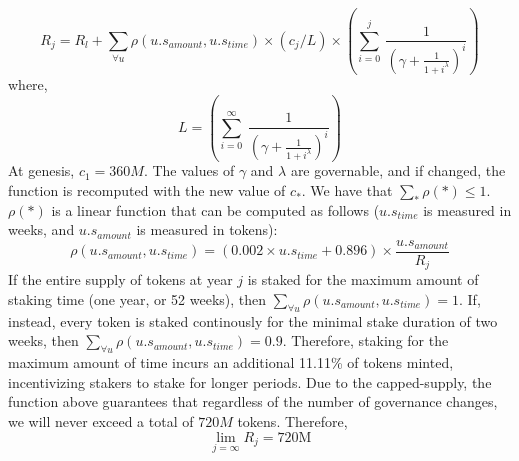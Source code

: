 \documentclass[runningheads]{llncs}
\newcommand\ddfrac[2]{\frac{\displaystyle #1}{\displaystyle #2}}
\begin{document}
\begin{equation}
R_j = R_{l} + \sum_{\forall u} \rho(u.s_{amount}, u.s_{time}) \times (c_j/L) \times \left(\sum\limits_{i=0}^{j}\ \ddfrac{1}{\left(\gamma + \ddfrac{1}{1 + i^{\lambda}}\right)^i} \right)
\label{equation:minting_function}
\end{equation}
where, 
\begin{equation}
L = \left(\sum\limits_{i=0}^{\infty}\ \ddfrac{1}{\left(\gamma + \ddfrac{1}{1 + i^{\lambda}}\right)^i}\right)
\end{equation}
At genesis, $c_1 = 360M$. The values of $\gamma$ and $\lambda$ are governable, and if changed, the function is recomputed with the new value of $c_{*}$. We have that $\sum_{*} \rho(*) \leq 1$. $\rho(*)$ is a linear function that can be computed as follows ($u.s_{time}$ is measured in weeks, and $u.s_{amount}$ is measured in \AVATokenName{} tokens): 
\begin{equation}
\rho(u.s_{amount}, u.s_{time}) = (0.002\times u.s_{time} + 0.896) \times \frac{u.s_{amount}}{R_j}
\end{equation}
If the entire supply of tokens at year $j$ is staked for the maximum amount of staking time (one year, or 52 weeks), then $\sum_{\forall u} \rho(u.s_{amount}, u.s_{time}) = 1$. If, instead, every token is staked continously for the minimal stake duration of two weeks, then $\sum_{\forall u} \rho(u.s_{amount}, u.s_{time}) = 0.9$. Therefore, staking for the maximum amount of time incurs an additional 11.11\% of tokens minted, incentivizing stakers to stake for longer periods. Due to the capped-supply, the function above guarantees that regardless of the number of governance changes, we will never exceed a total of $720M$ tokens. Therefore, 
\begin{equation}
    \lim_{j = \infty} R_j = \text{720M}
\end{equation}
\end{document}
